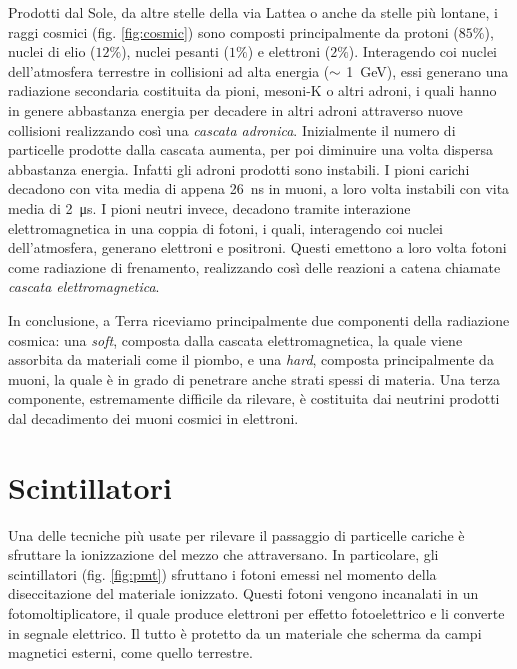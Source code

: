 \documentclass[../main.tex]{subfiles}
\begin{document}
Prodotti dal Sole, da altre stelle della via Lattea o anche da stelle più lontane, i raggi cosmici (fig. \ref{fig:cosmic}) sono composti principalmente da protoni ($85\%$), nuclei di elio ($12\%$), nuclei pesanti ($1\%$) e elettroni ($2\%$). Interagendo coi nuclei dell'atmosfera terrestre in collisioni ad alta energia ($\small \sim$ \SI{1}{\GeV}), essi generano una radiazione secondaria costituita da pioni, mesoni-K o altri adroni, i quali hanno in genere abbastanza energia per decadere in altri adroni attraverso nuove collisioni realizzando così una \emph{cascata adronica}. Inizialmente il numero di particelle prodotte dalla cascata aumenta, per poi diminuire una volta dispersa abbastanza energia. Infatti gli adroni prodotti sono instabili. I pioni carichi decadono con vita media di appena \SI{26}{\ns} in muoni, a loro volta instabili con vita media di \SI{2}{\micro\s}. I pioni neutri invece, decadono tramite interazione elettromagnetica in una coppia di fotoni, i quali, interagendo coi nuclei dell'atmosfera, generano elettroni e positroni. Questi emettono a loro volta fotoni come radiazione di frenamento, realizzando così delle reazioni a catena chiamate \emph{cascata elettromagnetica}.

In conclusione, a Terra riceviamo principalmente due componenti della radiazione cosmica: una \emph{soft}, composta dalla cascata elettromagnetica, la quale viene assorbita da materiali come il piombo, e una \emph{hard}, composta principalmente da muoni, la quale è in grado di penetrare anche strati spessi di materia. 
Una terza componente, estremamente difficile da rilevare, è costituita dai neutrini prodotti dal decadimento dei muoni cosmici in elettroni.

\section{Scintillatori}
Una delle tecniche più usate per rilevare il passaggio di particelle cariche è sfruttare la ionizzazione del mezzo che attraversano. In particolare, gli scintillatori (fig. \ref{fig:pmt}) sfruttano i fotoni emessi nel momento della diseccitazione del materiale ionizzato. Questi fotoni vengono incanalati in un fotomoltiplicatore, il quale produce elettroni per effetto fotoelettrico e li converte in segnale elettrico. Il tutto è protetto da un materiale che scherma da campi magnetici esterni, come quello terrestre.
\end{document}
